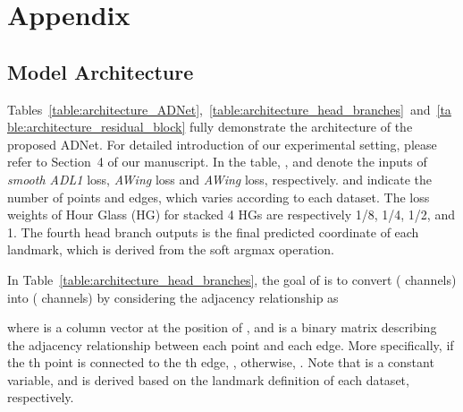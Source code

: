 \documentclass[10pt,twocolumn,letterpaper]{article}
\begin{document}
\section{Appendix}
\label{section:appendix}



\subsection{Model Architecture}
Tables~\ref{table:architecture_ADNet},~\ref{table:architecture_head_branches}~and~\ref{table:architecture_residual_block} fully demonstrate the architecture of the proposed ADNet. For detailed introduction of our experimental setting, please refer to Section~4 of our manuscript. In the table, ,  and  denote the inputs of \emph{smooth ADL1} loss, \emph{AWing} loss and \emph{AWing} loss, respectively.
 and  indicate the number of points and edges, which varies according to each dataset.
The loss weights of Hour Glass (HG) for stacked 4 HGs are respectively 1/8, 1/4, 1/2, and 1.
The fourth head branch outputs  is the final predicted coordinate of each landmark, which is derived from the soft argmax operation.

In Table~\ref{table:architecture_head_branches}, the goal of  is to convert  ( channels) into  ( channels) by considering the adjacency relationship as

where  is a column vector at the position of , and  is a  binary matrix describing the adjacency relationship between each point and each edge.
More specifically, if the th point is connected to the th edge, , otherwise, .
Note that  is a constant variable, and is derived based on the landmark definition of each dataset, respectively.
\end{document}
